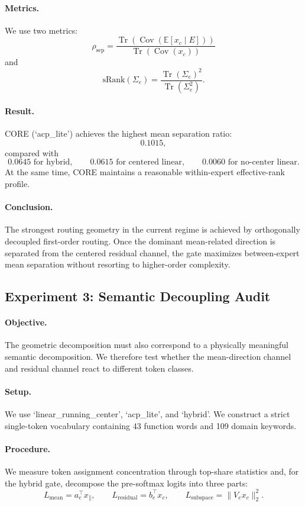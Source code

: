 \paragraph{Metrics.}
We use two metrics:
$$
\rho_{\mathrm{sep}}
=
\frac{\operatorname{Tr}(\operatorname{Cov}(\mathbb{E}[x_c\mid E]))}
{\operatorname{Tr}(\operatorname{Cov}(x_c))}
$$
and
$$
\mathrm{sRank}(\Sigma_e)
=
\frac{\operatorname{Tr}(\Sigma_e)^2}{\operatorname{Tr}(\Sigma_e^2)}.
$$

\paragraph{Result.}
CORE (`acp\_lite') achieves the highest mean separation ratio:
$$
0.1015,
$$
compared with
$$
0.0645 \text{ for hybrid}, \qquad
0.0615 \text{ for centered linear}, \qquad
0.0060 \text{ for no-center linear}.
$$
At the same time, CORE maintains a reasonable within-expert effective-rank profile.

\paragraph{Conclusion.}
The strongest routing geometry in the current regime is achieved by orthogonally decoupled first-order routing. Once the dominant mean-related direction is separated from the centered residual channel, the gate maximizes between-expert mean separation without resorting to higher-order complexity.

\subsection{Experiment 3: Semantic Decoupling Audit}
\paragraph{Objective.}
The geometric decomposition must also correspond to a physically meaningful semantic decomposition. We therefore test whether the mean-direction channel and residual channel react to different token classes.

\paragraph{Setup.}
We use `linear\_running\_center', `acp\_lite', and `hybrid'. We construct a strict single-token vocabulary containing 43 function words and 109 domain keywords.

\paragraph{Procedure.}
We measure token assignment concentration through top-share statistics and, for the hybrid gate, decompose the pre-softmax logits into three parts:
$$
L_{\mathrm{mean}}=a_e^\top x_{\parallel}, \qquad
L_{\mathrm{residual}}=b_e^\top x_c, \qquad
L_{\mathrm{subspace}}=\|V_e x_c\|_2^2.
$$


